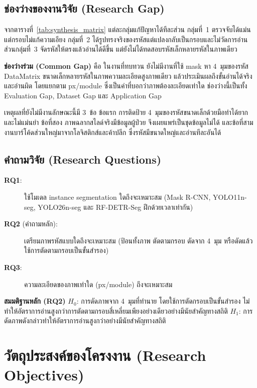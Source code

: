\documentclass[20pt,a4paper]{article}
\begin{document}
\subsection{ช่องว่างของงานวิจัย (Research Gap)}

จากตารางที่~\ref{tab:synthesis_matrix} แต่ละกลุ่มแก้ปัญหาได้ทีละส่วน
กลุ่มที่~1 ตรวจจับได้แม่นแต่กรอบไม่แก้ความเอียง
กลุ่มที่~2 ได้รูปทรงจริงของรหัสแต่แปลงกลับเป็นกรอบและไม่วัดการอ่าน
ส่วนกลุ่มที่~3 จัดรหัสให้ตรงแล้วอ่านได้ดีขึ้น
แต่ยังไม่ได้ทดสอบรหัสเล็กหลายรหัสในภาพเดียว

\textbf{ช่องว่างร่วม (Common Gap)} คือ
ในงานที่ทบทวน ยังไม่มีงานที่ใช้ mask หา 4~มุมของรหัส DataMatrix ขนาดเล็กหลายรหัสในภาพความละเอียดสูงภาพเดียว
แล้วประเมินผลถึงขั้นอ่านได้จริงและอ่านผิด โดยแยกตาม px/module
ซึ่งเป็นค่าที่บอกว่าภาพต้องละเอียดเท่าใด
ช่องว่างนี้เป็นทั้ง Evaluation Gap, Dataset Gap และ Application Gap

เหตุผลที่ยังไม่มีงานลักษณะนี้มี 3~ข้อ
ข้อแรก การติดป้าย 4~มุมของรหัสขนาดเล็กด้วยมือทำได้ยากและไม่แม่นยำ
ข้อที่สอง ภาพฉลากสไลด์จริงมีข้อมูลผู้ป่วย จึงเผยแพร่เป็นชุดข้อมูลไม่ได้
และข้อที่สาม งานบาร์โค้ดส่วนใหญ่มาจากโลจิสติกส์และค้าปลีก ซึ่งรหัสมีขนาดใหญ่และอ่านทีละอันได้

\subsection{คำถามวิจัย (Research Questions)}

\begin{description}
\item[\textbf{RQ1}:] ใช้โมเดล instance segmentation ใดถึงจะเหมาะสม
(Mask R-CNN, YOLO11n-seg, YOLO26n-seg และ RF-DETR-Seg ฝึกด้วยเวลาเท่ากัน)
\item[\textbf{RQ2} (คำถามหลัก):] เตรียมภาพรหัสแบบใดถึงจะเหมาะสม
(ป้อนทั้งภาพ ตัดตามกรอบ ดัดจาก 4~มุม หรือดัดแล้วใช้การตัดตามกรอบเป็นขั้นสำรอง)
\item[\textbf{RQ3}:] ความละเอียดของภาพเท่าใด (px/module) ถึงจะเหมาะสม
\end{description}

\textbf{สมมติฐานหลัก (RQ2)}
$H_0$: การดัดภาพจาก 4~มุมที่ทำนาย โดยใช้การตัดกรอบเป็นขั้นสำรอง
ไม่ทำให้อัตราการอ่านสูงกว่าการตัดตามกรอบสี่เหลี่ยมเพียงอย่างเดียวอย่างมีนัยสำคัญทางสถิติ
$H_1$: การดัดภาพดังกล่าวทำให้อัตราการอ่านสูงกว่าอย่างมีนัยสำคัญทางสถิติ


\section{วัตถุประสงค์ของโครงงาน (Research Objectives)}
\end{document}
